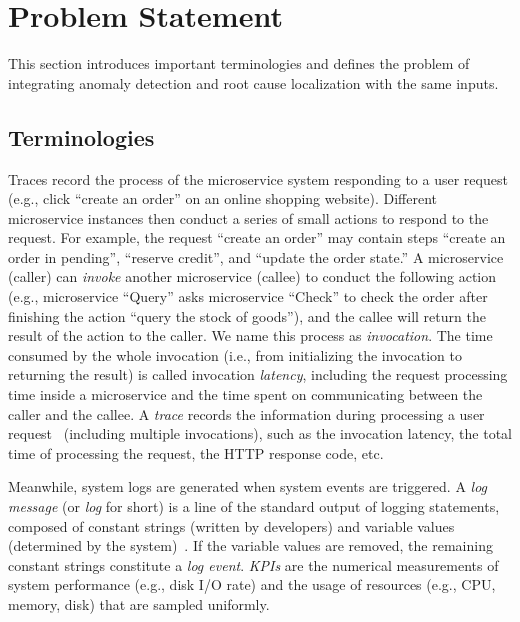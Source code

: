 \section{Problem Statement}
This section introduces important terminologies and defines the problem of integrating anomaly detection and root cause localization with the same inputs.

\subsection{Terminologies}
Traces record the process of the microservice system responding to a user request (e.g., click ``create an order'' on an online shopping website). 
Different microservice instances then conduct a series of small actions to respond to the request.
For example, the request ``create an order'' may contain steps ``create an order in pending'', ``reserve credit'', and ``update the order state.''
A microservice (caller) can \textit{invoke} another microservice (callee) to conduct the following action (e.g., microservice ``Query'' asks microservice ``Check'' to check the order after finishing the action ``query the stock of goods''), and the callee will return the result of the action to the caller. We name this process as \textit{invocation}.
The time consumed by the whole invocation (i.e., from initializing the invocation to returning the result) is called invocation \textit{latency}, including the request processing time inside a microservice and the time spent on communicating between the caller and the callee. 
A \textit{trace} records the information during processing a user request~\cite{MEPFL}  (including multiple invocations), such as the invocation latency, the total time of processing the request, the HTTP response code, etc.

Meanwhile, system logs are generated when system events are triggered. 
A \textit{log message} (or \textit{log} for short) is a line of the standard output of logging statements, composed of constant strings (written by developers) and variable values (determined by the system)~\cite{SurveyHe}. If the variable values are removed, the remaining constant strings constitute a \textit{log event}. 
\textit{KPIs} are the numerical measurements of system performance (e.g., disk I/O rate) and the usage of resources (e.g., CPU, memory, disk) that are sampled uniformly. 

